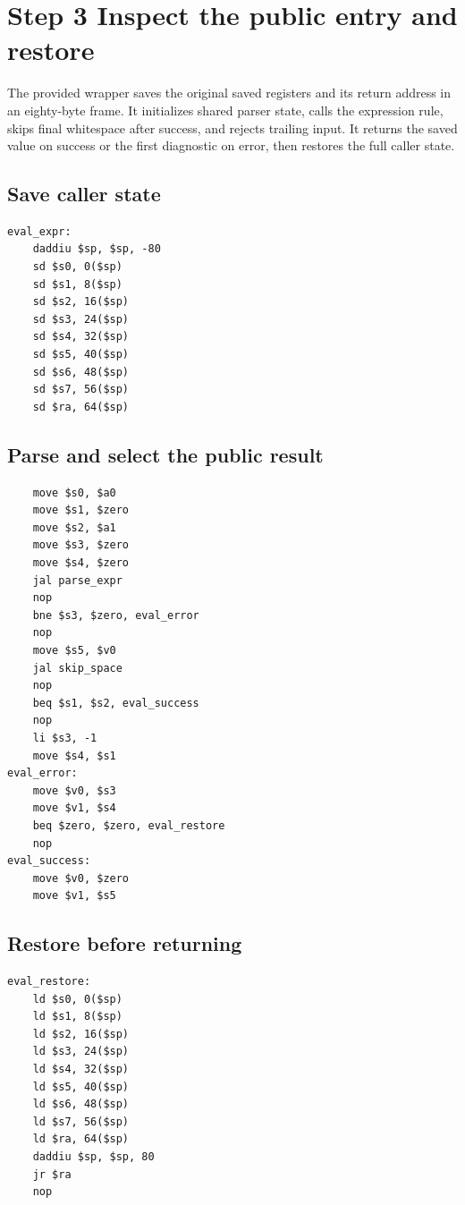 \section{Step 3 Inspect the public entry and restore}\label{expression-s03}

The provided wrapper saves the original saved registers and its return address in an eighty-byte frame. It initializes shared parser state, calls the expression rule, skips final whitespace after success, and rejects trailing input. It returns the saved value on success or the first diagnostic on error, then restores the full caller state.

\subsection{Save caller state}
\begin{verbatim}
eval_expr:
    daddiu $sp, $sp, -80
    sd $s0, 0($sp)
    sd $s1, 8($sp)
    sd $s2, 16($sp)
    sd $s3, 24($sp)
    sd $s4, 32($sp)
    sd $s5, 40($sp)
    sd $s6, 48($sp)
    sd $s7, 56($sp)
    sd $ra, 64($sp)
\end{verbatim}
\subsection{Parse and select the public result}
\begin{verbatim}
    move $s0, $a0
    move $s1, $zero
    move $s2, $a1
    move $s3, $zero
    move $s4, $zero
    jal parse_expr
    nop
    bne $s3, $zero, eval_error
    nop
    move $s5, $v0
    jal skip_space
    nop
    beq $s1, $s2, eval_success
    nop
    li $s3, -1
    move $s4, $s1
eval_error:
    move $v0, $s3
    move $v1, $s4
    beq $zero, $zero, eval_restore
    nop
eval_success:
    move $v0, $zero
    move $v1, $s5
\end{verbatim}
\subsection{Restore before returning}
\begin{verbatim}
eval_restore:
    ld $s0, 0($sp)
    ld $s1, 8($sp)
    ld $s2, 16($sp)
    ld $s3, 24($sp)
    ld $s4, 32($sp)
    ld $s5, 40($sp)
    ld $s6, 48($sp)
    ld $s7, 56($sp)
    ld $ra, 64($sp)
    daddiu $sp, $sp, 80
    jr $ra
    nop
\end{verbatim}
